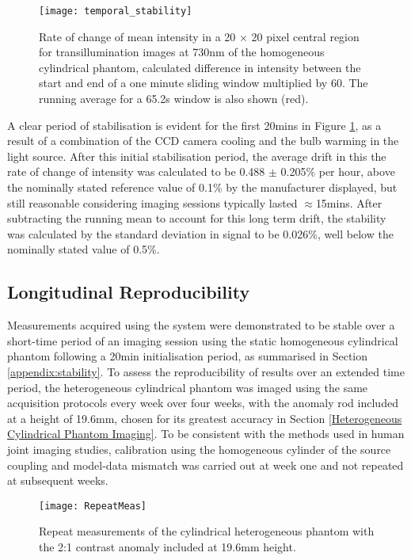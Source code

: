 \documentclass[twoside]{bhamthesis}
\theoremstyle{definition}
\begin{document}
\begin{figure}[!ht]
\centering
  \centering
  \texttt{[image: temporal\_stability]}
\caption{Rate of change of mean intensity in a 20 $\times$ 20 pixel central region for transillumination images at 730nm of the homogeneous cylindrical phantom, calculated difference in intensity between the start and end of a one minute sliding window multiplied by 60. The running average for a 65.2s window is also shown (red).}
  \label{fig:Temporal_stability}
\end{figure}

A clear period of stabilisation is evident for the first 20mins in Figure \ref{fig:Temporal_stability}, as a result of a combination of the CCD camera cooling and the bulb warming in the light source. After this initial stabilisation period, the average drift in this  the rate of change of intensity was calculated to be 0.488 $\pm$ 0.205\% per hour, above the nominally stated reference value of 0.1\% by the manufacturer displayed, but still reasonable considering imaging sessions typically lasted $\approx$15mins. After subtracting the running mean to account for this long term drift, the stability was calculated by the standard deviation in signal to be 0.026\%, well below the nominally stated value of 0.5\%.

\subsection{Longitudinal Reproducibility}

\label{Reproducibility}

Measurements acquired using the system were demonstrated to be stable over a short-time period of an imaging session using the static homogeneous cylindrical phantom following a 20min initialisation period, as summarised in Section \ref{appendix:stability}. To assess the reproducibility of results over an extended time period, the heterogeneous cylindrical phantom was imaged using the same acquisition protocols every week over four weeks, with the anomaly rod included at a height of 19.6mm, chosen for its greatest accuracy in Section \ref{Heterogeneous Cylindrical Phantom Imaging}. To be consistent with the methods used in human joint imaging studies, calibration using the homogeneous cylinder of the source coupling and model-data mismatch was carried out at week one and not repeated at subsequent weeks.

\begin{figure}[!ht]
\texttt{[image: RepeatMeas]}
\centering
\caption{Repeat measurements of the cylindrical heterogeneous phantom with the 2:1 contrast anomaly included at 19.6mm height.}
\centering
\label{tab:Repeats}
\end{figure}
\end{document}
